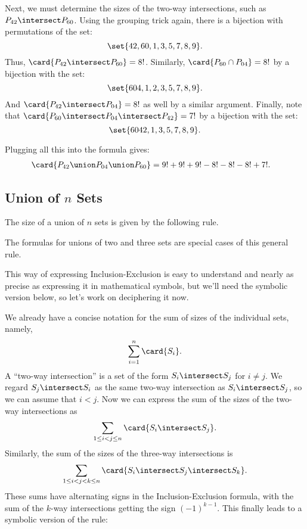 Next, we must determine the sizes of the two-way intersections, such
as $P_{42} \intersect P_{60}$.  Using the grouping trick again, there is a
bijection with permutations of the set:
%
\[
\set{42, 60, 1, 3, 5, 7, 8, 9}.
\]
%
Thus, $\card{P_{42} \intersect P_{60}} = 8!$.  Similarly, $\card{P_{60} \cap
P_{04}} = 8!$ by a bijection with the set:
%
\[
\set{604, 1, 2, 3, 5, 7, 8, 9}.
\]
%
And $\card{P_{42} \intersect P_{04}} = 8!$ as well by a similar argument.
Finally, note that $\card{P_{60} \intersect P_{04} \intersect P_{42}} = 7!$ by a
bijection with the set:
%
\[
\set{6042, 1, 3, 5, 7, 8, 9}.
\]

Plugging all this into the formula gives:
%
\begin{align*}
\card{P_{42} \union P_{04} \union P_{60}}
    & = 9! + 9! + 9! - 8! - 8! - 8! + 7!.
\end{align*}

\subsection{Union of $n$ Sets}

The size of a union of $n$ sets is given by the following rule.


The formulas for unions of two and three sets are special cases of this
general rule.

This way of expressing Inclusion-Exclusion is easy to understand and
nearly as precise as expressing it in mathematical symbols, but we'll need
the symbolic version below, so let's work on deciphering it now.

We already have a concise notation for the sum of sizes of the
individual sets, namely,
\[
\sum_{i=1}^n \card{S_i}.
\]
A ``two-way intersection'' is a set of the form $S_i \intersect S_j$ for
$i \neq j$.  We regard $S_j \intersect S_i$ as the same two-way
intersection as $S_i \intersect S_j$, so we can assume that $i < j$.  Now
we can express the sum of the sizes of the two-way intersections as
\[
\sum_{1\leq i < j \leq n} \card{S_i \intersect S_j}.
\]
Similarly, the sum of the sizes of the three-way intersections is
\[
\sum_{1\leq i < j < k \leq n} \card{S_i \intersect S_j \intersect S_k}.
\]
These sums have alternating signs in the Inclusion-Exclusion formula, with
the sum of the $k$-way intersections getting the sign $(-1)^{k-1}$.  This
finally leads to a symbolic version of the rule:

